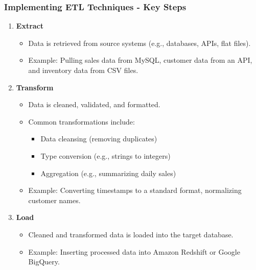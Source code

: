 \documentclass[aspectratio=169]{beamer}
\begin{document}
\begin{frame}[fragile]
    \frametitle{Implementing ETL Techniques - Key Steps}
    \begin{enumerate}
        \item \textbf{Extract}
            \begin{itemize}
                \item Data is retrieved from source systems (e.g., databases, APIs, flat files).
                \item Example: Pulling sales data from MySQL, customer data from an API, and inventory data from CSV files.
            \end{itemize}
        
        \item \textbf{Transform}
            \begin{itemize}
                \item Data is cleaned, validated, and formatted.
                \item Common transformations include:
                    \begin{itemize}
                        \item Data cleansing (removing duplicates)
                        \item Type conversion (e.g., strings to integers)
                        \item Aggregation (e.g., summarizing daily sales)
                    \end{itemize}
                \item Example: Converting timestamps to a standard format, normalizing customer names.
            \end{itemize}

        \item \textbf{Load}
            \begin{itemize}
                \item Cleaned and transformed data is loaded into the target database.
                \item Example: Inserting processed data into Amazon Redshift or Google BigQuery.
            \end{itemize}
    \end{enumerate}
\end{frame}
\end{document}
